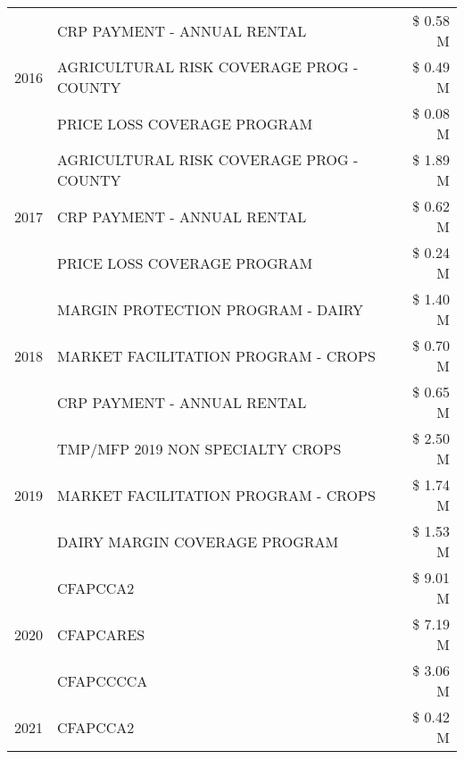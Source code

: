 \begin{tabular}{llr}
\cline{1-3}
\multirow[t]{3}{*}{2016} & CRP PAYMENT - ANNUAL RENTAL & \$ 0.58 M \\
 & AGRICULTURAL RISK COVERAGE PROG - COUNTY & \$ 0.49 M \\
 & PRICE LOSS COVERAGE PROGRAM & \$ 0.08 M \\
\cline{1-3}
\multirow[t]{3}{*}{2017} & AGRICULTURAL RISK COVERAGE PROG - COUNTY & \$ 1.89 M \\
 & CRP PAYMENT - ANNUAL RENTAL & \$ 0.62 M \\
 & PRICE LOSS COVERAGE PROGRAM & \$ 0.24 M \\
\cline{1-3}
\multirow[t]{3}{*}{2018} & MARGIN PROTECTION PROGRAM - DAIRY & \$ 1.40 M \\
 & MARKET FACILITATION PROGRAM - CROPS & \$ 0.70 M \\
 & CRP PAYMENT - ANNUAL RENTAL & \$ 0.65 M \\
\cline{1-3}
\multirow[t]{3}{*}{2019} & TMP/MFP 2019 NON SPECIALTY CROPS & \$ 2.50 M \\
 & MARKET FACILITATION PROGRAM - CROPS & \$ 1.74 M \\
 & DAIRY MARGIN COVERAGE PROGRAM & \$ 1.53 M \\
\cline{1-3}
\multirow[t]{3}{*}{2020} & CFAPCCA2 & \$ 9.01 M \\
 & CFAPCARES & \$ 7.19 M \\
 & CFAPCCCCA & \$ 3.06 M \\
\cline{1-3}
2021 & CFAPCCA2 & \$ 0.42 M \\
\cline{1-3}
\bottomrule
\end{tabular}
